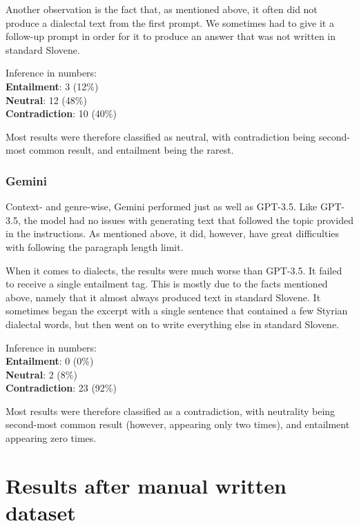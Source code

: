 \documentclass[fleqn,moreauthors,10pt]{ds_report}
\begin{document}
    Another observation is the fact that, as mentioned above, it often did not produce a dialectal text from the first prompt. We sometimes had to give it a follow-up prompt in order for it to produce an answer that was not written in standard Slovene.
    
\vspace{\baselineskip}
Inference in numbers:
\n\\ \textbf{Entailment}: 3 (12\%)
\textbf{\n\\Neutral}: 12 (48\%)
\textbf{\n\\Contradiction}: 10 (40\%)

\vspace{\baselineskip}
Most results were therefore classified as neutral, with contradiction being second-most common result, and entailment being the rarest.

\subsubsection{Gemini}

    Context- and genre-wise, Gemini performed just as well as GPT-3.5. Like GPT-3.5, the model had no issues with generating text that followed the topic provided in the instructions. As mentioned above, it did, however, have great difficulties with following the paragraph length limit.

    When it comes to dialects, the results were much worse than GPT-3.5. It failed to receive a single entailment tag. This is mostly due to the facts mentioned above, namely that it almost always produced text in standard Slovene. It sometimes began the excerpt with a single sentence that contained a few Styrian dialectal words, but then went on to write everything else in standard Slovene.
    
\vspace{\baselineskip}
Inference in numbers:
\n\\ \textbf{Entailment}: 0 (0\%)
\textbf{\n\\Neutral}: 2 (8\%)
\textbf{\n\\Contradiction}: 23 (92\%)

\vspace{\baselineskip}
Most results were therefore classified as a contradiction, with neutrality being second-most common result (however, appearing only two times), and entailment appearing zero times.


\section{Results after manual written dataset}
\end{document}
